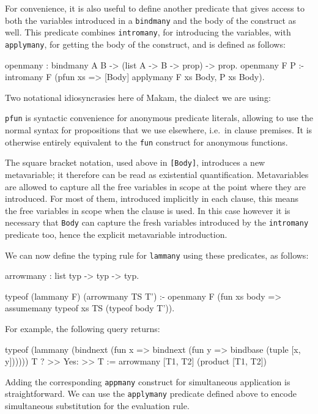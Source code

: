 \documentclass[format=acmlarge,review,anonymous]{acmart}\settopmatter{printfolios=true}
\begin{document}
For convenience, it is also useful to define another predicate that
gives access to both the variables introduced in a \texttt{bindmany} and
the body of the construct as well. This predicate combines
\texttt{intromany}, for introducing the variables, with
\texttt{applymany}, for getting the body of the construct, and is
defined as follows:

\begin{codequote}
openmany : bindmany A B -> (list A -> B -> prop) -> prop.
openmany F P :-
  intromany F (pfun xs => [Body] applymany F xs Body, P xs Body).
\end{codequote}

Two notational idiosyncrasies here of Makam, the \lamprolog dialect we are
using:

\texttt{pfun} is syntactic convenience for anonymous predicate literals,
allowing to use the normal syntax for propositions that we use
elsewhere, i.e.~in clause premises. It is otherwise entirely equivalent
to the \texttt{fun} construct for anonymous functions.

The square bracket notation, used above in \texttt{{[}Body{]}},
introduces a new metavariable; it therefore can be read as existential
quantification. Metavariables are allowed to capture all the free
variables in scope at the point where they are introduced. For most of
them, introduced implicitly in each clause, this means the free
variables in scope when the clause is used. In this case however it is
necessary that \texttt{Body} can capture the fresh variables introduced
by the \texttt{intromany} predicate too, hence the explicit metavariable
introduction.

We can now define the typing rule for \texttt{lammany} using these
predicates, as follows:

\begin{codequote}
arrowmany : list typ -> typ -> typ.

typeof (lammany F) (arrowmany TS T') :-
  openmany F (fun xs body =>
    assumemany typeof xs TS (typeof body T')).
\end{codequote}

For example, the following query returns:

\begin{codequote}
typeof (lammany (bindnext (fun x => bindnext (fun y => bindbase (tuple [x, y]))))) T ?
>> Yes:
>> T := arrowmany [T1, T2] (product [T1, T2])
\end{codequote}

Adding the corresponding \texttt{appmany} construct for simultaneous
application is straightforward. We can use the \texttt{applymany}
predicate defined above to encode simultaneous substitution for the
evaluation rule.
\end{document}
